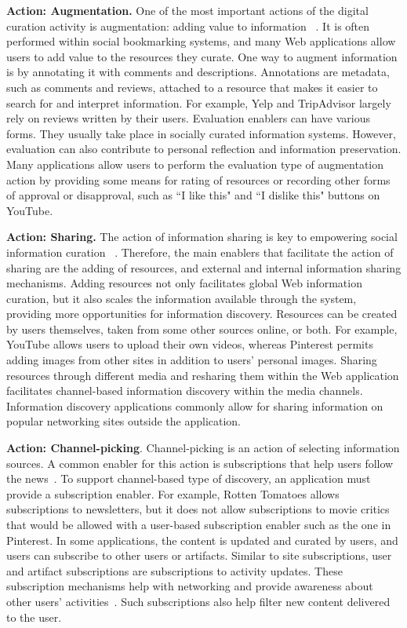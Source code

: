 \documentclass[review]{elsarticle}
\newcommand{\feature}[1]{{\ttfamily#1}}
\begin{document}
{{\textbf{Action: Augmentation.}
One of the most important actions of the digital curation activity is augmentation: adding value to information ~\cite{beagrie2008digital,whittaker2011personal}. It is often performed within social bookmarking systems, and many Web applications allow users to add value to the resources they curate. 
%
One way to augment information is by \feature{annotating} it with comments and descriptions. Annotations are metadata, such as comments and reviews, attached to a resource that makes it easier to search for and interpret information. For example, Yelp and TripAdvisor largely rely on reviews written by their users. 
%
\feature{Evaluation} enablers can have various forms. They usually take place in socially curated information systems. However, evaluation can also contribute to personal reflection and information preservation. Many applications allow users to perform the evaluation type of augmentation action by providing some means for rating of resources or recording other forms of approval or disapproval, such as ``I like this" and ``I dislike this" buttons on YouTube.

\textbf{Action: Sharing.}
The action of information sharing is key to empowering social information curation ~\cite{beagrie2008digital}. Therefore, the main enablers that facilitate the action of sharing are the adding of resources, and external and internal information sharing mechanisms.
%
\feature{Adding resources} not only facilitates global Web information curation, but it also scales the information available through the system, providing more opportunities for information discovery. Resources can be created by users themselves, taken from some other sources online, or both. For example, YouTube allows users to upload their own videos, whereas Pinterest permits adding images from other sites in addition to users' personal images. 
%
Sharing resources through different media and resharing them within the Web application facilitates channel-based information discovery within the media channels. Information discovery applications commonly allow for sharing information on popular networking sites outside the application.


\textbf{Action: Channel-picking}. Channel-picking is an action of selecting information sources. A common enabler for this action is subscriptions that help users follow the news~\cite{java2007feeds}. To support channel-based type of discovery, an application must provide a subscription enabler. For example, Rotten Tomatoes allows \feature{subscriptions} to \feature{newsletters}, but it does not allow subscriptions to movie critics that would be allowed with a user-based subscription enabler such as the one in Pinterest. 
%
In some applications, the content is updated and curated by users, and users can \feature{subscribe} to other \feature{users} or \feature{artifacts}. Similar to site subscriptions, user and artifact subscriptions are subscriptions to activity updates. These subscription mechanisms help with networking and provide awareness about other users' activities~\cite{millen2005social}. Such subscriptions also help filter new content delivered to the user. 
} %

}
\end{document}
